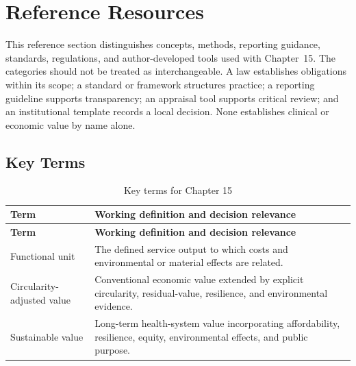 \section{Reference Resources}
\label{sec:comp-ch15-reference}

This reference section distinguishes concepts, methods, reporting guidance,
standards, regulations, and author-developed tools used with Chapter~15. The
categories should not be treated as interchangeable. A law establishes obligations
within its scope; a standard or framework structures practice; a reporting guideline
supports transparency; an appraisal tool supports critical review; and an
institutional template records a local decision. None establishes clinical or
economic value by name alone. 

\subsection{Key Terms}
\begin{longtable}{@{}p{}p{}@{}}
\caption{Key terms for Chapter 15}
\label{tab:comp-ch15-key-terms}\\
\toprule
\textbf{Term} & \textbf{Working definition and decision relevance} \\
\midrule
\endfirsthead
\toprule
\textbf{Term} & \textbf{Working definition and decision relevance} \\
\midrule
\endhead
\bottomrule
\endlastfoot
Functional unit & The defined service output to which costs and environmental or material effects are related. \\
Circularity-adjusted value & Conventional economic value extended by explicit circularity, residual-value, resilience, and environmental evidence. \\
Sustainable value & Long-term health-system value incorporating affordability, resilience, equity, environmental effects, and public purpose. \\
\end{longtable}

